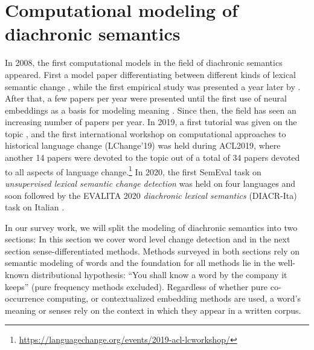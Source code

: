 \documentclass[output=paper]{langsci/langscibook}
\begin{document}
\section{Computational modeling of diachronic semantics}\label{sec:wsch}
In 2008, the first computational models in the field of diachronic semantics appeared. First a model paper differentiating between different kinds of lexical semantic change \citep{tahmasebi2008}, while the first empirical study was presented a year later by \citet{sagi-etal-2009-semantic}. After that, a few papers per year were presented until the first use of neural embeddings as a basis for modeling meaning \citep{kim-etal-2014-temporal}. Since then, the field has seen an increasing number of papers per year. In 2019, a first tutorial was given on the topic \citep{eisenstein2019measuring}, and  the first international workshop on computational approaches to historical language change (LChange'19) was held during ACL2019, \citep{ws-2019-international-approaches} where another 14 papers were devoted to the topic out of a total of 34 papers devoted to all aspects of language change.\footnote{\url{https://languagechange.org/events/2019-acl-lcworkshop/}}  In 2020, the first SemEval task on \emph{unsupervised lexical semantic change detection}  was held on four languages \citep{schlechtweg-etal-2020-semeval} and soon followed by the EVALITA 2020 \emph{diachronic lexical semantics} (DIACR-Ita) task on Italian \citep{diacrita_evalita2020}.


In our survey work, we will split the modeling of diachronic semantics into two sections: In this section we cover word level change detection and in the next section sense-differentiated methods. Methods surveyed in both sections rely on semantic modeling of words and the foundation for all methods lie in the well-known distributional hypothesis: ``You shall know a word by the company it keeps'' \citep[11]{firth1957} (pure frequency methods excluded). Regardless of whether pure co-occurrence computing, or contextualized embedding methods are used, a word's meaning or senses rely on the context in which they appear in a written corpus.
\end{document}
